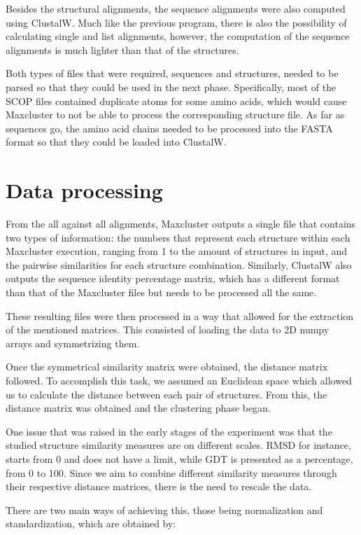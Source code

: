 Besides the structural alignments, the sequence alignments were also computed using ClustalW. Much like the previous program, there is also the possibility of calculating single and list alignments, however, the computation of the sequence alignments is much lighter than that of the structures.

Both types of files that were required, sequences and structures, needed to be parsed so that they could be used in the next phase. Specifically, most of the SCOP files contained duplicate atoms for some amino acids, which would cause Maxcluster to not be able to process the corresponding structure file. As far as sequences go, the amino acid chains needed to be processed into the FASTA format so that they could be loaded into ClustalW.

\section{Data processing} 

From the all against all alignments, Maxcluster outputs a single file that contains two types of information: the numbers that represent each structure within each Maxcluster execution, ranging from 1 to the amount of structures in input, and the pairwise similarities for each structure combination. Similarly, ClustalW also outputs the sequence identity percentage matrix, which has a different format than that of the Maxcluster files but needs to be processed all the same.

These resulting files were then processed in a way that allowed for the extraction of the mentioned matrices. This consisted of loading the data to 2D numpy arrays and symmetrizing them.

Once the symmetrical similarity matrix were obtained, the distance matrix followed. To accomplish this task, we assumed an Euclidean space which allowed us to calculate the distance between each pair of structures. From this, the distance matrix was obtained and the clustering phase began.

One issue that was raised in the early stages of the experiment was that the studied structure similarity measures are on different scales. RMSD for instance, starts from 0 and does not have a limit, while GDT is presented as a percentage, from 0 to 100. Since we aim to combine different similarity measures through their respective distance matrices, there is the need to rescale the data.

There are two main ways of achieving this, those being normalization and standardization, which are obtained by:

